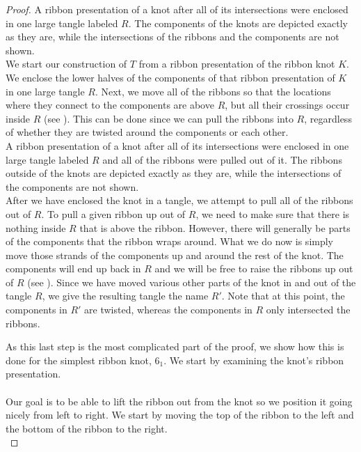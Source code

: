 \begin{paper}
\begin{proof}
{A ribbon presentation of a knot after all of its intersections were enclosed in
one large tangle labeled $R$.
The components of the knots are depicted exactly as they are, while the
intersections of the ribbons and the components are not shown.}\\

We start our construction of $T$ from a ribbon presentation of the ribbon knot
$K$.
We enclose the lower halves of the components of that ribbon presentation of $K$
in one large tangle $R$.
Next, we move all of the ribbons so that the locations where they connect to the
components are above $R$, but all their crossings occur inside $R$
(see \figLowered).
This can be done since we can pull the ribbons into $R$, regardless of whether
they are twisted around the components or each other.\\

{A ribbon presentation of a knot after all of its intersections were enclosed in
one large tangle labeled $R$ and all of the ribbons were pulled out of it.
The ribbons outside of the knots are depicted exactly as they are, while the
intersections of the components are not shown.}\\

After we have enclosed the knot in a tangle, we attempt to pull all of the
ribbons out of $R$.
To pull a given ribbon up out of $R$, we need to make sure that there is nothing
inside $R$ that is above the ribbon.
However, there will generally be parts of the components that the ribbon wraps
around.
What we do now is simply move those strands of the components up and around the
rest of the knot.
The components will end up back in $R$ and we will be free to raise the ribbons
up out of $R$ (see \figTwisted).
Since we have moved various other parts of the knot in and out of the tangle
$R$, we give the resulting tangle the name $R'$.
Note that at this point, the components in $R'$ are twisted, whereas the
components in $R$ only intersected the ribbons.

As this last step is the most complicated part of the proof, we show how this is
done for the simplest ribbon knot, $6_1$.
We start by examining the knot's ribbon presentation.\\

\\

Our goal is to be able to lift the ribbon out from the knot so we position it
going nicely from left to right.
We start by moving the top of the ribbon to the left and the bottom of the
ribbon to the right.\\


\end{proof}
\end{paper}

